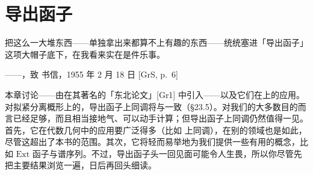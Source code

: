 
\chapter{导出函子}
\label{ch:derived-functors}

\epigraph{把这么一大堆东西——单独拿出来都算不上有趣的东西——统统塞进「导出函子」这项大帽子底下，在我看来实在是件乐事。}{——\trGrothendieck，致 \trSerre 书信，1955 年 2 月 18 日 [GrS, p.~6]}

本章讨论\trDerivedFunctor——由\trGrothendieck 在其著名的「东北论文」[Gr1] 中引入——以及它们在\trSheaf{}上的应用。对拟紧分离概形上的\trQCSheaf，导出函子上同调将与\trCechCohomology{}一致（\S23.5）。\trCechCohomology{}对我们的大多数目的而言已经足够，而且相当接地气、可以动手计算；但导出函子上同调仍然值得一见。首先，它在代数几何中的应用要广泛得多（比如 \trEtale{}上同调），在别的领域也是如此，尽管这超出了本书的范围。其次，它将轻而易举地为我们提供一些有用的概念，比如 $\mathrm{Ext}$ 函子与\trLeray{}谱序列。不过，导出函子头一回见面可能令人生畏，所以你尽管先把主要结果浏览一遍，日后再回头细读。






